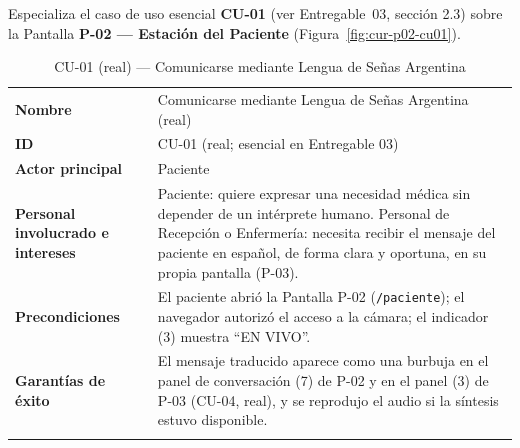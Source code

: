 Especializa el caso de uso esencial \textbf{CU-01} (ver Entregable~03,
sección 2.3) sobre la Pantalla \textbf{P-02 --- Estación del Paciente}
(Figura~\ref{fig:cur-p02-cu01}).


\begin{longtable}{@{}p{4.1cm} >{\raggedright\arraybackslash}p{11.2cm}@{}}
\toprule
\textbf{Nombre} & Comunicarse mediante Lengua de Señas Argentina (real) \\
\textbf{ID} & CU-01 (real; esencial en Entregable 03) \\
\textbf{Actor principal} & Paciente \\
\textbf{Personal involucrado e intereses} &
Paciente: quiere expresar una necesidad médica sin depender de un
intérprete humano. \newline
Personal de Recepción o Enfermería: necesita recibir el mensaje del
paciente en español, de forma clara y oportuna, en su propia pantalla (P-03). \\
\textbf{Precondiciones} &
El paciente abrió la Pantalla P-02 (\texttt{/paciente}); el navegador
autorizó el acceso a la cámara; el indicador (3) muestra ``EN VIVO''. \\
\textbf{Garantías de éxito} &
El mensaje traducido aparece como una burbuja en el panel de conversación
(7) de P-02 y en el panel (3) de P-03 (CU-04, real), y se reprodujo el
audio si la síntesis estuvo disponible. \\
\bottomrule
\caption{CU-01 (real) — Comunicarse mediante Lengua de Señas Argentina}
\end{longtable}

